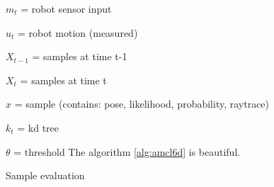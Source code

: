 \documentclass[Thesis.tex]{subfiles}
\begin{document}
$m_{t}$ = robot sensor input

$u_{t}$ = robot motion (measured)

$X_{t-1}$ = samples at time t-1

$X_{t}$ = samples at time t

$x$ = sample (contains: pose, likelihood, probability, raytrace)

$k_{t}$ = kd tree

$\theta$ = threshold
The algorithm \ref{alg:amcl6d} is beautiful.

\begin{algorithm}
\caption{Sample evaluation}
\label{alg:eval}

\ev{}{
}
\end{algorithm}
\end{document}

